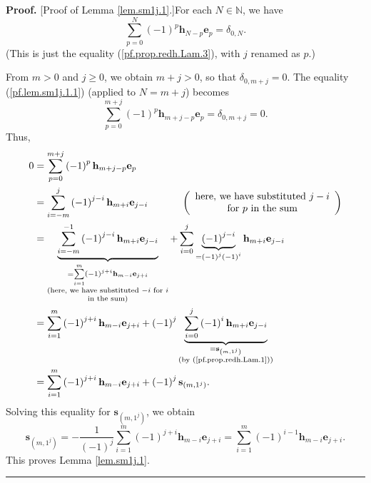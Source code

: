 \documentclass[numbers=enddot,12pt,final,onecolumn,notitlepage]{scrartcl}%
\theoremstyle{definition}
\newenvironment{proof}[1][Proof]{\noindent\textbf{#1.} }{\ \rule{0.5em}{0.5em}}
\let\sumnonlimits\sum
\renewcommand{\sum}{\sumnonlimits\limits}
\begin{document}
\begin{proof}
[Proof of Lemma \ref{lem.sm1j.1}.]For each $N\in\mathbb{N}$, we have%
\begin{equation}
\sum_{p=0}^{N}\left(  -1\right)  ^{p}\mathbf{h}_{N-p}\mathbf{e}_{p}%
=\delta_{0,N}. \label{pf.lem.sm1j.1.1}%
\end{equation}
(This is just the equality (\ref{pf.prop.redh.Lam.3}), with $j$ renamed as $p$.)

From $m>0$ and $j\geq0$, we obtain $m+j>0$, so that $\delta_{0,m+j}=0$. The
equality (\ref{pf.lem.sm1j.1.1}) (applied to $N=m+j$) becomes%
\[
\sum_{p=0}^{m+j}\left(  -1\right)  ^{p}\mathbf{h}_{m+j-p}\mathbf{e}_{p}%
=\delta_{0,m+j}=0.
\]
Thus,%
\begin{align*}
0  &  =\sum_{p=0}^{m+j}\left(  -1\right)  ^{p}\mathbf{h}_{m+j-p}\mathbf{e}%
_{p}\\
&  =\sum_{i=-m}^{j}\left(  -1\right)  ^{j-i}\mathbf{h}_{m+i}\mathbf{e}%
_{j-i}\ \ \ \ \ \ \ \ \ \ \left(
\begin{array}
[c]{c}%
\text{here, we have substituted }j-i\\
\text{for }p\text{ in the sum}%
\end{array}
\right) \\
&  =\underbrace{\sum_{i=-m}^{-1}\left(  -1\right)  ^{j-i}\mathbf{h}%
_{m+i}\mathbf{e}_{j-i}}_{\substack{=\sum_{i=1}^{m}\left(  -1\right)
^{j+i}\mathbf{h}_{m-i}\mathbf{e}_{j+i}\\\text{(here, we have substituted
}-i\text{ for }i\\\text{in the sum)}}}+\sum_{i=0}^{j}\underbrace{\left(
-1\right)  ^{j-i}}_{=\left(  -1\right)  ^{j}\left(  -1\right)  ^{i}}%
\mathbf{h}_{m+i}\mathbf{e}_{j-i}\\
&  =\sum_{i=1}^{m}\left(  -1\right)  ^{j+i}\mathbf{h}_{m-i}\mathbf{e}%
_{j+i}+\left(  -1\right)  ^{j}\underbrace{\sum_{i=0}^{j}\left(  -1\right)
^{i}\mathbf{h}_{m+i}\mathbf{e}_{j-i}}_{\substack{=\mathbf{s}_{\left(
m,1^{j}\right)  }\\\text{(by (\ref{pf.prop.redh.Lam.1}))}}}\\
&  =\sum_{i=1}^{m}\left(  -1\right)  ^{j+i}\mathbf{h}_{m-i}\mathbf{e}%
_{j+i}+\left(  -1\right)  ^{j}\mathbf{s}_{\left(  m,1^{j}\right)  }.
\end{align*}
Solving this equality for $\mathbf{s}_{\left(  m,1^{j}\right)  }$, we obtain%
\[
\mathbf{s}_{\left(  m,1^{j}\right)  }=-\dfrac{1}{\left(  -1\right)  ^{j}}%
\sum_{i=1}^{m}\left(  -1\right)  ^{j+i}\mathbf{h}_{m-i}\mathbf{e}_{j+i}%
=\sum_{i=1}^{m}\left(  -1\right)  ^{i-1}\mathbf{h}_{m-i}\mathbf{e}_{j+i}.
\]
This proves Lemma \ref{lem.sm1j.1}.
\end{proof}
\end{document}
